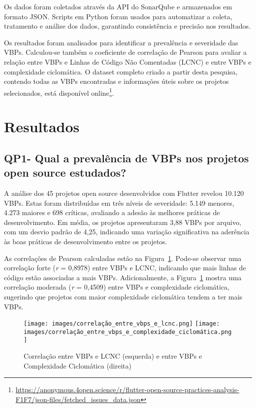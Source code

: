 \documentclass[12pt]{article}
\begin{document}
Os dados foram coletados através da API do SonarQube e armazenados em formato JSON. Scripts em Python foram usados para automatizar a coleta, tratamento e análise dos dados, garantindo consistência e precisão nos resultados. 

Os resultados foram analisados para identificar a prevalência e severidade das VBPs. Calculou-se também o coeficiente de correlação de Pearson para avaliar a relação entre VBPs e Linhas de Código Não Comentadas (LCNC) e entre VBPs e complexidade ciclomática. O dataset completo criado a partir desta pesquisa, contendo todas as VBPs encontradas e informações úteis sobre os projetos selecionados, está disponível online\footnote{\url{https://anonymous.4open.science/r/flutter-open-source-practices-analysis-F1F7/json-files/fetched_issues_data.json}}.

\section{Resultados}
\subsection{QP1- Qual a prevalência de VBPs nos projetos open source estudados?}
A análise dos 45 projetos open source desenvolvidos com Flutter revelou 10.120 VBPs. Estas foram distribuídas em três níveis de severidade: 5.149 menores, 4.273 maiores e 698 críticas, avaliando a adesão às melhores práticas de desenvolvimento. Em média, os projetos apresentaram 3,88 VBPs por arquivo, com um desvio padrão de 4,25, indicando uma variação significativa na aderência às boas práticas de desenvolvimento entre os projetos.

As correlações de Pearson calculadas estão na Figura~\ref{fig:vbps_vs_lcnc_and_vbps_vs_complexity}. Pode-se observar uma correlação forte (\textit{r} = 0,8978) entre VBPs e LCNC, indicando que mais linhas de código estão associadas a mais VBPs. Adicionalmente, a Figura~\ref{fig:vbps_vs_lcnc_and_vbps_vs_complexity} mostra uma correlação moderada (\textit{r} = 0,4509) entre VBPs e complexidade ciclomática, sugerindo que projetos com maior complexidade ciclomática tendem a ter mais VBPs.

\begin{figure}[H]
\centering
\texttt{[image: images/correlação\_entre\_vbps\_e\_lcnc.png]}
\texttt{[image: images/correlação\_entre\_vbps\_e\_complexidade\_ciclomática.png]}
\caption{Correlação entre VBPs e LCNC (esquerda) e entre VBPs e Complexidade Ciclomática (direita)}
\label{fig:vbps_vs_lcnc_and_vbps_vs_complexity}
\end{figure}
\end{document}
